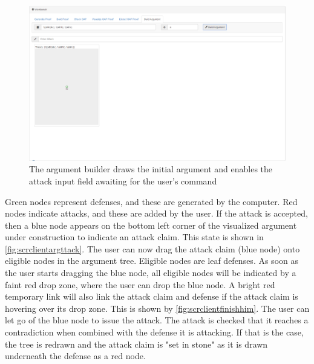 \documentclass[11pt,twoside,a4paper]{report}
\begin{document}
\begin{figure}[htp]
\centerline{\includegraphics[scale=0.3]{img/scr-client-argbuilder.png}}
\caption{The argument builder draws the initial argument and enables the attack input field awaiting for the user's command\label{fig:scrclientargbuilder}}
\end{figure}

Green nodes represent defenses, and these are generated by the computer. Red nodes indicate attacks, and these are added by the user. If the attack is accepted, then a blue node appears on the bottom left corner of the visualized argument under construction to indicate an attack claim. This state is shown in \autoref{fig:scrclientargttack}. The user can now drag the attack claim (blue node) onto eligible nodes in the argument tree. Eligible nodes are leaf defenses. As soon as the user starts dragging the blue node, all eligible nodes will be indicated by a faint red drop zone, where the user can drop the blue node. A bright red temporary link will also link the attack claim and defense if the attack claim is hovering over its drop zone. This is shown by \autoref{fig:scrclientfinishhim}. The user can let go of the blue node to issue the attack. The attack is checked that it reaches a contradiction when combined with the defense it is attacking. If that is the case, the tree is redrawn and the attack claim is "set in stone" as it is drawn underneath the defense as a red node.
\end{document}
